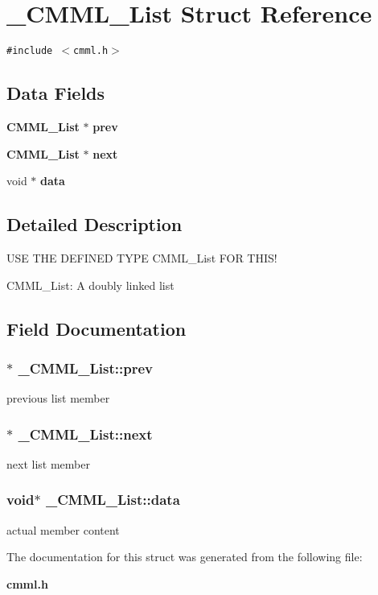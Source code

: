\section{\_\-CMML\_\-List Struct Reference}
\label{struct__CMML__List}
{\tt \#include $<$cmml.h$>$}

\subsection*{Data Fields}
\begin{CompactItemize}
\item 
{\bf CMML\_\-List} $\ast$ {\bf prev}
\item 
{\bf CMML\_\-List} $\ast$ {\bf next}
\item 
void $\ast$ {\bf data}
\end{CompactItemize}


\subsection{Detailed Description}
USE THE DEFINED TYPE CMML\_\-List FOR THIS!

CMML\_\-List: A doubly linked list 



\subsection{Field Documentation}
\subsubsection{$\ast$ {\bf \_\-CMML\_\-List::prev}}\label{struct__CMML__List_o0}


previous list member 
\subsubsection{$\ast$ {\bf \_\-CMML\_\-List::next}}\label{struct__CMML__List_o1}


next list member 
\subsubsection{\setlength{\rightskip}{0pt plus 5cm}void$\ast$ {\bf \_\-CMML\_\-List::data}}\label{struct__CMML__List_o2}


actual member content 

The documentation for this struct was generated from the following file:\begin{CompactItemize}
\item 
{\bf cmml.h}\end{CompactItemize}
